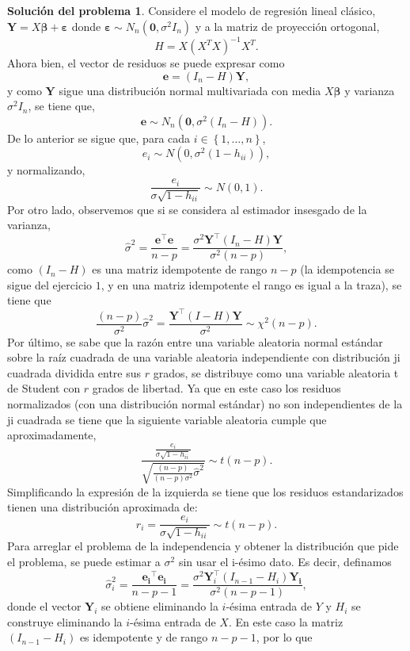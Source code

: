 \documentclass[twoside,12pt]{article}
\theoremstyle{definition}
\newtheorem{soln}{Solución del problema}
\begin{document}
\newpage
\begin{soln}
 Considere el modelo de regresión lineal clásico, $\boldsymbol{Y}=X\boldsymbol{\beta} + \boldsymbol{\varepsilon}$ donde $\boldsymbol{\varepsilon}\sim N_n(\boldsymbol{0},\sigma^2 I_n)$ y a la matriz de proyección ortogonal,
\[
H=X{(X^T X)}^{-1}X^T.
\]
Ahora bien, el vector de residuos se puede expresar como 
\[
\boldsymbol{e}=(I_n-H)\boldsymbol{Y},
\]
y como $\boldsymbol{Y}$ sigue una distribución normal multivariada con media $X\boldsymbol{\beta}$ y varianza $\sigma^2 I_n$, se tiene que, 
\[
\boldsymbol{e}\sim N_n\left(\mathbf{0}, \sigma^2\left(I_n-H\right)\right).
\]
De lo anterior se sigue que, para cada $i\in \left\lbrace 1, \ldots, n \right\rbrace$,
\[
e_i \sim N(0,\sigma^2 (1-h_{ii})),
\]
y normalizando,
\[
\frac{e_i}{\sigma\sqrt{1-h_{ii}}}\sim N(0,1).
\]
Por otro lado, observemos que si se considera al estimador insesgado de la varianza,
\[
\hat{\sigma}^2=\frac{\mathbf{e}^{\top} \mathbf{e}}{n-p}=\frac{\sigma^2 \mathbf{Y}^{\top}(I_n-H) \mathbf{Y}}{\sigma^2 (n-p)},
\]
como $(I_n-H)$ es una matriz idempotente de rango $n-p$ (la idempotencia se sigue del ejercicio $1$, y en una matriz idempotente el rango es igual a la traza), se tiene que 
\[
\frac{(n-p)}{\sigma^2}\hat{\sigma}^2= \frac{ \mathbf{Y}^{\top}(I-H) \mathbf{Y}}{\sigma^2} \sim \chi^2(n-p).
\]
Por último, se sabe que la razón entre una variable aleatoria normal estándar sobre la raíz cuadrada de una variable aleatoria independiente con distribución ji cuadrada dividida entre sus $r$ grados, se distribuye como una variable aleatoria t de Student con $r$ grados de libertad. Ya que en este caso los residuos normalizados (con una distribución  normal estándar) no son independientes de la ji cuadrada se tiene que la siguiente variable aleatoria cumple que aproximadamente,
\[
\frac{\frac{e_i}{\sigma\sqrt{1-h_{ii}}}}{\sqrt{\frac{(n-p)}{(n-p)\sigma^2}\hat{\sigma}^2}} \sim t(n-p).
\]
Simplificando la expresión de la izquierda se tiene que los residuos estandarizados tienen una distribución aproximada de:
\[
r_i=\frac{e_i}{\hat{\sigma} \sqrt{1-h_{i i}}} \sim t(n-p).
\]
Para arreglar el problema de la independencia y obtener la distribución que pide el problema, se puede estimar a $\sigma^2$ sin usar el i-ésimo dato. Es decir, definamos
\[
\hat{\sigma}_{i}^2=\frac{\mathbf{e_i}^{\top} \mathbf{e_i}}{n-p-1}=\frac{\sigma^2 \mathbf{Y}_i^{\top}(I_{n-1}-H_i) \mathbf{Y_i}}{\sigma^2 (n-p-1)},
\]
donde el vector $\mathbf{Y}_i$ se obtiene eliminando la $i$-ésima entrada de $Y$ y $H_i$ se construye eliminando la $i$-ésima entrada de $X$. En este caso la matriz $(I_{n-1}-H_i)$ es idempotente y de rango $n-p-1$, por lo que

\end{soln}
\end{document}
